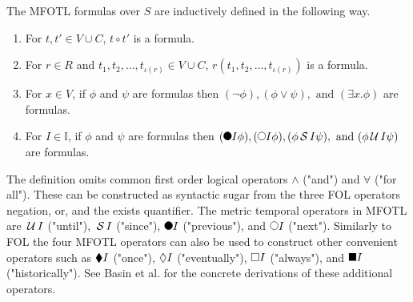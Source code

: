 \renewcommand{\labelenumi}{(\roman{enumi})}
\begin{definition}
    The MFOTL formulas over $S$ are inductively defined in the following way.
    \begin{enumerate}
        \item For $t,t' \in V \cup C$, $t \circ t'$ is a formula.
        \item For $r \in R$ and $t_1, t_2, \dots, t_{\iota(r)} \in V \cup C$, $r(t_1,t_2,\dots,t_{\iota(r)})$ is a formula.
        \item For $x \in V$, if $\phi$ and $\psi$ are formulas then $(\neg \phi),(\phi \lor \psi),\text{ and }(\exists x . \phi)$ are formulas.
        \item For $I \in \mathbb{I}$, if $\phi$ and $\psi$ are formulas then $(\Previous{I} \phi), (\Next{I} \phi), (\phi \Since{I} \psi), \text{ and }(\phi \Until{I} \psi)$ are formulas.
    \end{enumerate}
\end{definition}

The definition omits common first order logical operators $\land$ ("and") and $\forall$ ("for all").
These can be constructed as syntactic sugar from the three FOL operators negation, or, and the exists quantifier.
The metric temporal operators in MFOTL are $\,\mathcal{U}\,{I}$ ("until"), $\,\mathcal{S}\,{I}$ ("since"), $\Previous{I}$ ("previous"), and $\Next{I}$ ("next").
Similarly to FOL the four MFOTL operators can also be used to construct other convenient operators such as $\blacklozenge{I}$ ("once"), $\lozenge{I}$ ("eventually"), $\square{I}$ ("always"), and $\blacksquare{I}$ ("historically").
See Basin et al. \cite{Basin2015} for the concrete derivations of these additional operators.

